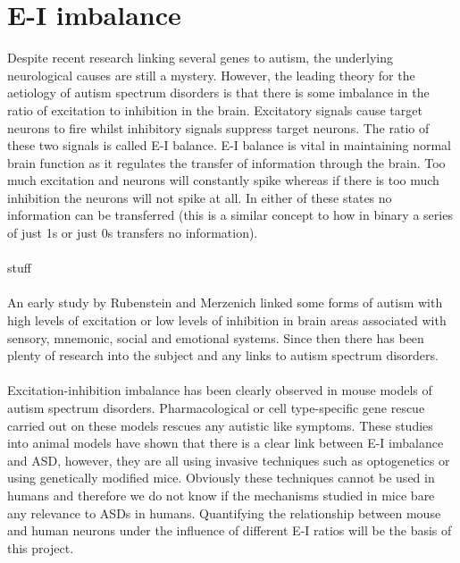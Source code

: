 \documentclass{epsrc}
\begin{document}
\section{E-I imbalance}
\noindent
Despite recent research linking several genes to autism, the underlying neurological causes are still a mystery. However, the leading theory for the aetiology of autism spectrum disorders is that there is some imbalance in the ratio of excitation to inhibition in the brain. Excitatory signals cause target neurons to fire whilst inhibitory signals suppress target neurons. The ratio of these two signals is called E-I balance. E-I balance is vital in maintaining normal brain function as it regulates the transfer of information through the brain. Too much excitation and neurons will constantly spike whereas if there is too much inhibition the neurons will not spike at all. In either of these states no information can be transferred (this is a similar concept to how in binary a series of just 1s or just 0s transfers no information). 
\\\\
stuff
\\\\
An early study by Rubenstein and Merzenich \cite{rubenstein2003model} linked some forms of autism with high levels of excitation or low levels of inhibition in brain areas associated with sensory, mnemonic, social and emotional systems. Since then there has been plenty of research into the subject and any links to autism spectrum disorders.
\\\\
Excitation-inhibition imbalance has been clearly observed in mouse models of autism spectrum disorders. Pharmacological or cell type-specific gene rescue carried out on these models rescues any autistic like symptoms. These studies into animal models have shown that there is a clear link between E-I imbalance and ASD, however, they are all using invasive techniques such as optogenetics or using genetically modified mice. Obviously these techniques cannot be used in humans and therefore we do not know if the mechanisms studied in mice bare any relevance to ASDs in humans. Quantifying the relationship between mouse and human neurons under the influence of different E-I ratios will be the basis of this project. 
\\
\end{document}
